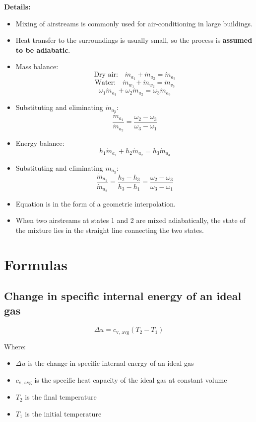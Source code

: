 \documentclass[11pt]{article}
\begin{document}
\textbf{Details:}
\begin{itemize}
\item Mixing of airstreams is commonly used for air-conditioning in large buildings.
\item Heat transfer to the surroundings is usually small, so the process is \textbf{assumed to be adiabatic}.
\item Mass balance:
\[\text{Dry air:} \quad \dot{m}_{a_1} + \dot{m}_{a_2} = \dot{m}_{a_3}\]
\[\text{Water:} \quad \dot{m}_{w_1} + \dot{m}_{w_2} = \dot{m}_{v_3}\]
\[\omega_1 \dot{m}_{a_1} + \omega_2 \dot{m}_{a_2} = \omega_3 \dot{m}_{a_3}\]
\item Substituting and eliminating \(\dot{m}_{a_3}\):
\[\frac{\dot{m}_{a_1}}{\dot{m}_{a_2}} = \frac{\omega_2 - \omega_3}{\omega_3 - \omega_1}\]
\item Energy balance:
\[h_1 \dot{m}_{a_1} + h_2 \dot{m}_{a_2} = h_3 \dot{m}_{a_3}\]
\item Substituting and eliminating \(\dot{m}_{a_3}\):
\[\frac{\dot{m}_{a_1}}{\dot{m}_{a_2}} = \frac{h_2 - h_3}{h_3 - h_1} = \frac{\omega_2 - \omega_3}{\omega_3 - \omega_1}\]
\item Equation is in the form of a geometric interpolation.
\item When two airstreams at states 1 and 2 are mixed adiabatically, the state of the mixture lies in the straight line connecting the two states.
\end{itemize}

 \newpage

\section{Formulas}
\label{sec:org0b83f22}

\subsection{Change in specific internal energy of an ideal gas}
\label{sec:org4598693}
\[\Delta u = c_{\text{v, avg}} (T_2 - T_1)\]

Where:
\begin{itemize}
\item \(\Delta u\) is the change in specific internal energy of an ideal gas
\item \(c_{\text{v, avg}}\) is the specific heat capacity of the ideal gas at constant volume
\item \(T_2\) is the final temperature
\item \(T_1\) is the initial temperature
\end{itemize}
\end{document}

